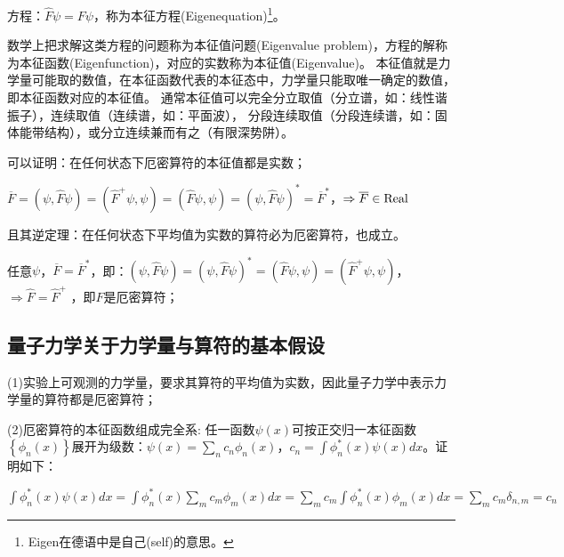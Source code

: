 方程：$\hat F\psi  = F\psi
$，称为本征方程(Eigenequation)\footnote{Eigen在德语中是自己(self)的意思。}。


数学上把求解这类方程的问题称为本征值问题(Eigenvalue
problem)，方程的解称为本征函数(Eigenfunction)，对应的实数称为本征值(Eigenvalue)。
本征值就是力学量可能取的数值，在本征函数代表的本征态中，力学量只能取唯一确定的数值，即本征函数对应的本征值。
通常本征值可以完全分立取值（分立谱，如：线性谐振子），连续取值（连续谱，如：平面波），
分段连续取值（分段连续谱，如：固体能带结构），或分立连续兼而有之（有限深势阱）。




可以证明：在任何状态下厄密算符的本征值都是实数；


$\overline F = \left( {\psi ,\hat F\psi } \right) = \left( {\hat F^
+  \psi ,\psi } \right) = \left( {\hat F\psi ,\psi } \right) =
\left( {\psi ,\hat F\psi } \right)^*  = \overline F ^* $，$
\Rightarrow \overline F  \in {\rm{Real}}$

且其逆定理：在任何状态下平均值为实数的算符必为厄密算符，也成立。

任意$\psi$，$\overline F  = \overline F ^* $，即：$\left( {\psi ,\hat F\psi } \right) = \left( {\psi ,\hat F\psi } \right)^*  = \left( {\hat F\psi ,\psi } \right) = \left( {\hat F^ +  \psi ,\psi } \right)$，$ \Rightarrow \hat F = \hat F^ +  $ ，即$\hat F$是厄密算符；


\subsection{量子力学关于力学量与算符的基本假设}

(1)实验上可观测的力学量，要求其算符的平均值为实数，因此量子力学中表示力学量的算符都是厄密算符；

(2)厄密算符的本征函数组成完全系: 任一函数$\psi \left( x
\right)$可按正交归一本征函数$\left\{ {\phi _n \left( x \right)}
\right\}$展开为级数：$\psi \left( x \right) = \sum\limits_n {c_n
\phi _n \left( x \right)} $，$c_n = \int {\phi _n ^* \left( x \right)\psi \left( x \right)dx}$。证明如下：


$\int {\phi _n ^* \left( x \right)\psi \left( x \right)dx} = 
\int {\phi _n ^* \left( x \right)\sum\limits_m {c_m \phi _m \left( x
\right)dx} } = \sum\limits_m {c_m \int {\phi _n ^* \left( x
\right)} \phi _m \left( x \right)dx} 
=  \sum\limits_m {c_m \delta _{n,m} }  = c_n$


